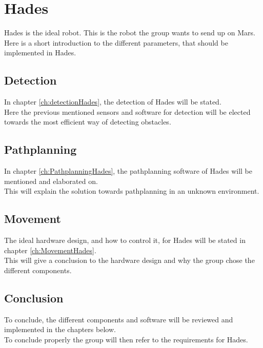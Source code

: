 \chapter{Hades}

Hades is the ideal robot. This is the robot the group wants to send up on Mars.\\
Here is a short introduction to the different parameters, that should be implemented in Hades.\\

\section{Detection}
In chapter \ref{ch:detectionHades}, the detection of Hades will be stated.\\
Here the previous mentioned sensors and software for detection will be elected towards the most efficient way of detecting obstacles.\\

\section{Pathplanning}
In chapter \ref{ch:PathplanningHades}, the pathplanning software of Hades will be mentioned and elaborated on.\\
This will explain the solution towards pathplanning in an unknown environment.\\

\section{Movement}
The ideal hardware design, and how to control it, for Hades will be stated in chapter \ref{ch:MovementHades}.\\
This will give a conclusion to the hardware design and why the group chose the different components.\\

\section{Conclusion}
To conclude, the different components and software will be reviewed and implemented in the chapters below.\\
To conclude properly the group will then refer to the requirements for Hades.\\

